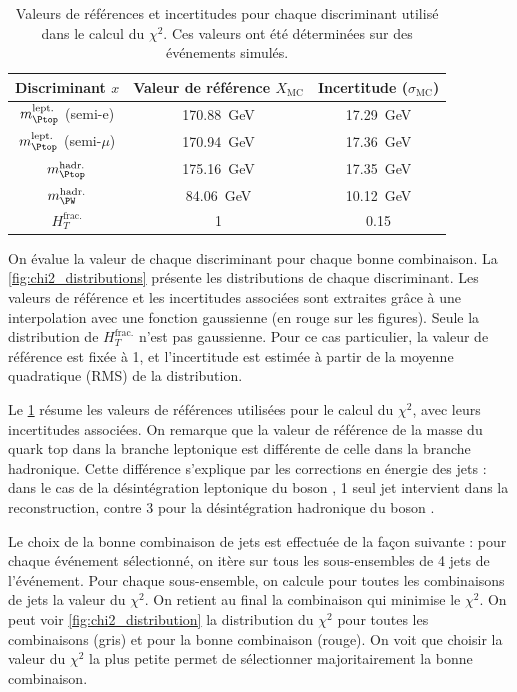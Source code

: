 \begin{table} \centering
    \begin{tabular}{@{}ccc@{}} \toprule
        Discriminant $x$& Valeur de référence $X_\text{MC}$ & Incertitude ($\sigma_\text{MC}$) \\ \midrule
        $m_{\Ptop}^{\text{lept.}}$ (semi-e) & \SI{170.88}{\GeV} & \SI{17.29}{\GeV} \\
        $m_{\Ptop}^{\text{lept.}}$ (semi-$\mu$) & \SI{170.94}{\GeV} & \SI{17.36}{\GeV} \\
        $m_{\Ptop}^{\text{hadr.}}$ & \SI{175.16}{\GeV} & \SI{17.35}{\GeV} \\
        $m_{\PW}^{\text{hadr.}}$ & \SI{84.06}{\GeV} & \SI{10.12}{\GeV} \\
        $H_{T}^{\text{frac.}}$ & \num{1} & \num{0.15} \\ \bottomrule
    \end{tabular}
    \caption{Valeurs de références et incertitudes pour chaque discriminant utilisé dans le calcul du $\chi^2$. Ces valeurs ont été déterminées sur des événements \ttbar simulés.}
    \label{tab:chi2_ref_values}
\end{table}

On évalue la valeur de chaque discriminant pour chaque bonne combinaison. La \cref{fig:chi2_distributions} présente les distributions de chaque discriminant. Les valeurs de référence et les incertitudes associées sont extraites grâce à une interpolation avec une fonction gaussienne (en rouge sur les figures). Seule la distribution de $H_T^\text{frac.}$ n'est pas gaussienne. Pour ce cas particulier, la valeur de référence est fixée à 1, et l'incertitude est estimée à partir de la moyenne quadratique (RMS) de la distribution.

Le \cref{tab:chi2_ref_values} résume les valeurs de références utilisées pour le calcul du $\chi^2$, avec leurs incertitudes associées. On remarque que la valeur de référence de la masse du quark top dans la branche leptonique est différente de celle dans la branche hadronique. Cette différence s'explique par les corrections en énergie des jets : dans le cas de la désintégration leptonique du boson \PW, 1 seul jet intervient dans la reconstruction, contre 3 pour la désintégration hadronique du boson \PW.

\bigskip

Le choix de la bonne combinaison de jets est effectuée de la façon suivante : pour chaque événement sélectionné, on itère sur tous les sous-ensembles de 4 jets de l'événement. Pour chaque sous-ensemble, on calcule pour toutes les combinaisons de jets la valeur du $\chi^2$. On retient au final la combinaison qui minimise le $\chi^2$. On peut voir \cref{fig:chi2_distribution} la distribution du $\chi^2$ pour toutes les combinaisons (gris) et pour la bonne combinaison (rouge). On voit que choisir la valeur du $\chi^2$ la plus petite permet de sélectionner majoritairement la bonne combinaison.

